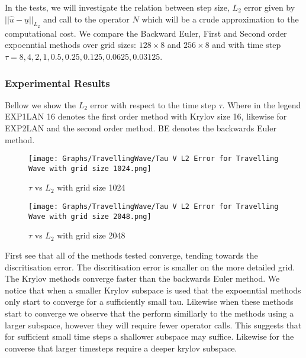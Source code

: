 In the tests, we will investigate the relation between step size, $L_2$ error given by $||\hat u - \underline{u}||_{L_2}$ and call to the operator $N$ which will be a crude approximation to the computational cost.
We compare the Backward Euler, First and Second order expoenntial methods over grid sizes: $128 \times 8$ and $256 \times 8$ and with time step $\tau=8,4,2,1,0.5,0.25,0.125,0.0625,0.03125$.

\subsubsection{Experimental Results}

Bellow we show the $L_2$ error with respect to the time step $\tau$.
Where in the legend EXP1LAN 16 denotes the first order method with Krylov size 16, likewise for EXP2LAN and the second order method.
BE denotes the backwards Euler method.

\begin{figure}[H]
    \centering
    \begin{minipage}{0.49\textwidth}
        \texttt{[image: Graphs/TravellingWave/Tau V L2 Error for Travelling Wave with grid size 1024.png]} %
        \caption{$\tau$ vs $L_2$ with grid size 1024}
        \label{fig:plot1}
    \end{minipage}\hfill
    \centering
    \begin{minipage}{0.49\textwidth}
        \texttt{[image: Graphs/TravellingWave/Tau V L2 Error for Travelling Wave with grid size 2048.png]} %
        \caption{$\tau$ vs $L_2$ with grid size 2048}
        \label{fig:plot2}
    \end{minipage}\hfill
\end{figure}

First see that all of the methods tested converge, tending towards the discritisation error.
The discritisation error is smaller on the more detailed grid.
The Krylov methods converge faster than the backwards Euler method.
We notice that when a smaller Krylov subspace is used that the expoenntial methods only start to converge for a sufficiently small tau.
Likewise when these methods start to converge we observe that the perform simillarly to the methods using a larger subspace, however they will require fewer operator calls.
This suggests that for sufficient small time steps a shallower subspace may suffice.
Likewise for the converse that larger timesteps require a deeper krylov subspace.

